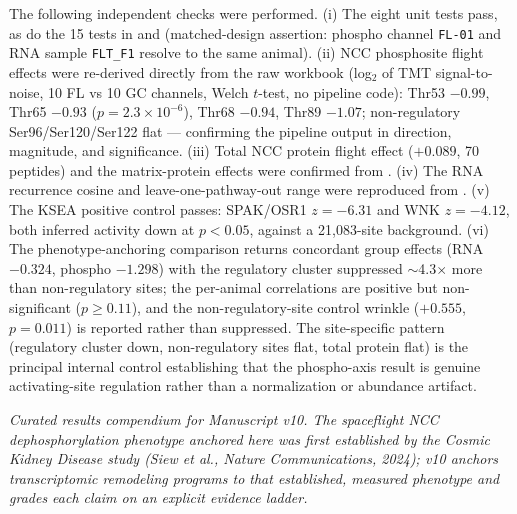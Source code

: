 \documentclass[10pt]{article}
\newcommand{\code}[1]{\texttt{#1}}
\begin{document}
The following independent checks were performed. (i) The eight  unit tests pass, as do the 15 tests in  and  (matched-design assertion: phospho channel \code{FL-01} and RNA sample \code{FLT\_F1} resolve to the same animal). (ii) NCC phosphosite flight effects were re-derived directly from the raw  workbook (log$_2$ of TMT signal-to-noise, 10 FL vs 10 GC channels, Welch $t$-test, no pipeline code): Thr53 $-0.99$, Thr65 $-0.93$ ($p=2.3\times10^{-6}$), Thr68 $-0.94$, Thr89 $-1.07$; non-regulatory Ser96/Ser120/Ser122 flat --- confirming the pipeline output in direction, magnitude, and significance. (iii) Total NCC protein flight effect ($+0.089$, 70 peptides) and the matrix-protein effects were confirmed from . (iv) The RNA recurrence cosine and leave-one-pathway-out range were reproduced from . (v) The KSEA positive control passes: SPAK/OSR1 $z=-6.31$ and WNK $z=-4.12$, both inferred activity down at $p<0.05$, against a 21{,}083-site background. (vi) The phenotype-anchoring comparison returns concordant group effects (RNA $-0.324$, phospho $-1.298$) with the regulatory cluster suppressed $\sim$4.3$\times$ more than non-regulatory sites; the per-animal correlations are positive but non-significant ($p\geq0.11$), and the non-regulatory-site control wrinkle ($+0.555$, $p=0.011$) is reported rather than suppressed. The site-specific pattern (regulatory cluster down, non-regulatory sites flat, total protein flat) is the principal internal control establishing that the phospho-axis result is genuine activating-site regulation rather than a normalization or abundance artifact.

\vspace{1em}
\noindent\itshape Curated results compendium for Manuscript v10. The spaceflight NCC dephosphorylation phenotype anchored here was first established by the Cosmic Kidney Disease study (Siew et al., \emph{Nature Communications}, 2024); v10 anchors transcriptomic remodeling programs to that established, measured phenotype and grades each claim on an explicit evidence ladder.
\end{document}
